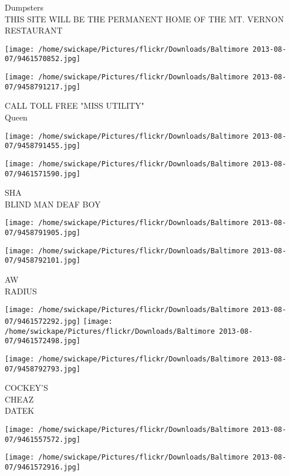 \documentclass[10pt,letterpaper]{article}
\begin{document}
Dumpsters\\
THIS SITE WILL BE THE PERMANENT HOME OF THE MT. VERNON RESTAURANT
\pagebreak

\texttt{[image: /home/swickape/Pictures/flickr/Downloads/Baltimore 2013-08-07/9461570852.jpg]}

\vspace{0.25in}
\texttt{[image: /home/swickape/Pictures/flickr/Downloads/Baltimore 2013-08-07/9458791217.jpg]}

CALL TOLL FREE "MISS UTILITY"\\
Queen
\pagebreak

\texttt{[image: /home/swickape/Pictures/flickr/Downloads/Baltimore 2013-08-07/9458791455.jpg]}

\vspace{0.25in}
\texttt{[image: /home/swickape/Pictures/flickr/Downloads/Baltimore 2013-08-07/9461571590.jpg]}

SHA\\
BLIND MAN DEAF BOY
\pagebreak

\texttt{[image: /home/swickape/Pictures/flickr/Downloads/Baltimore 2013-08-07/9458791905.jpg]}

\vspace{0.25in}
\texttt{[image: /home/swickape/Pictures/flickr/Downloads/Baltimore 2013-08-07/9458792101.jpg]}

AW\\
RADIUS
\pagebreak

\texttt{[image: /home/swickape/Pictures/flickr/Downloads/Baltimore 2013-08-07/9461572292.jpg]}
\texttt{[image: /home/swickape/Pictures/flickr/Downloads/Baltimore 2013-08-07/9461572498.jpg]}

\vspace{0.25in}
\texttt{[image: /home/swickape/Pictures/flickr/Downloads/Baltimore 2013-08-07/9458792793.jpg]}

COCKEY'S\\
CHEAZ\\
DATEK
\pagebreak

\texttt{[image: /home/swickape/Pictures/flickr/Downloads/Baltimore 2013-08-07/9461557572.jpg]}

\vspace{0.25in}
\texttt{[image: /home/swickape/Pictures/flickr/Downloads/Baltimore 2013-08-07/9461572916.jpg]}
\end{document}
